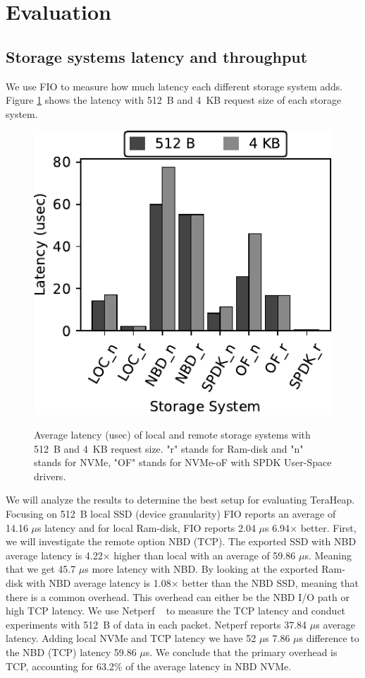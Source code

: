 \section{Evaluation}
\subsection{Storage systems latency and throughput}
We use FIO to measure how much latency each different storage system adds.
Figure \ref{fig:fio_512} shows the latency with \SI{512}{B} and \SI{4}{KB} request size
of each storage system.

\begin{figure}[H]
  \includegraphics[width=\linewidth]{figures/fio_lat.pdf}\\
\caption{Average latency (usec) of local and remote storage systems with \SI{512}{B} and \SI{4}{KB} request size. "r" stands for Ram-disk and "n" stands for NVMe, "OF" stands for NVMe-oF with SPDK User-Space drivers.}
\label{fig:fio_512}
\end{figure}

We will analyze the results to determine the best setup for evaluating TeraHeap. Focusing on \SI{512}{B} local SSD (device granularity) FIO reports an average of 14.16 $\mu$s latency and for local Ram-disk, FIO reports 2.04 $\mu$s 6.94$\times$ better. First, we will investigate the remote option NBD (TCP). The exported SSD with NBD average latency is 4.22$\times$ higher than local with an average of 59.86 $\mu$s. Meaning that we get 45.7 $\mu$s more latency with NBD. By looking at the exported Ram-disk with NBD average latency is 1.08$\times$ better than the NBD SSD, meaning that there is a common overhead. This overhead can either be the NBD I/O path or high TCP latency. We use Netperf ~\cite{netperf} to measure the TCP latency and conduct experiments with \SI{512}{B} of data in each packet. Netperf reports 37.84 $\mu$s average
latency. Adding local NVMe and TCP latency we have 52 $\mu$s 7.86 $\mu$s difference to the NBD (TCP) latency 59.86 $\mu$s. We conclude that the primary overhead is TCP, accounting for 63.2\% of the average latency in NBD NVMe.

